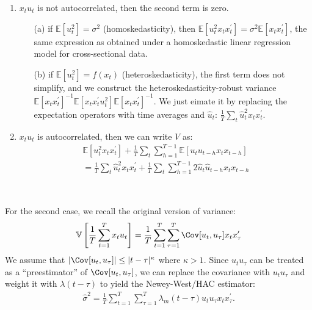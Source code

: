\begin{enumerate}
    \item $x_t u_t$ is not autocorrelated, then the second term is zero.
        \begin{enumerate}
            \item[(a)] if $\mathbb{E}[u_t^2] = \sigma^2$ (homoskedasticity), then $\mathbb{E}[u_t^2 x_t x_t^{\prime}] = \sigma^2 \mathbb{E}[x_t x_t^{\prime}]$,
            the same expression as obtained under a homoskedastic linear regression model for cross-sectional data.
            \item[(b)] if $\mathbb{E}[u_t^2] = f(x_t)$ (heteroskedasticity), the first term does not simplify,
            and we construct the heteroskedasticity-robust variance $\mathbb{E}[x_t x_t^{\prime}]^{-1} \mathbb{E}[x_t x_t^{\prime} u_t^2] \mathbb{E}[x_t x_t^{\prime}]^{-1}$.
            We just eimate it by replacing the expectation operators with time averages and $\hat{u}_t$: $\frac{1}{T} \sum_{t} \hat{u}_t^2 x_t x_t^{\prime}.$
        \end{enumerate}
    \item $x_t u_t$ is autocorrelated, then we can write $V$ as:
        \begin{gather*}
            \mathbb{E}[u_t^2 x_t x_t^{\prime}] + \frac{1}{T} \sum_{t} \sum_{h=1}^{T-1} \mathbb{E}[u_t u_{t-h} x_t x_{t-h}] \\
            = \frac{1}{T} \sum_{t} \hat{u}_t^2 x_t x_t^{\prime} + \frac{1}{T} \sum_{t} \sum_{h=1}^{T-1} 2 \hat{u}_t \hat{u}_{t-h} x_t x_{t-h}  
        \end{gather*}
\end{enumerate}

\begin{remark}
    \

    For the second case, we recall the original version of variance:
    \begin{gather*}
        \mathbb{V}\left[\frac{1}{T} \sum_{t=1}^{T} x_t u_t\right] = \frac{1}{T} \sum_{t=1}^{T} \sum_{\tau=1}^{T} \Cov[u_t, u_{\tau}] x_t x_{\tau}^{\prime}  
    \end{gather*}
    We assume that $\vert \Cov[u_t, u_{\tau}] \vert \leq \vert t-\tau \vert^{\kappa} $ where $\kappa>1$.
    Since $u_t u_{\tau}$ can be treated as a ``preestimator'' of $\Cov[u_t, u_{\tau}]$,
    we can replace the covariance with $u_t u_{\tau}$ and weight it with $\lambda(t-\tau)$ to yield the Newey-West/HAC estimator:
    \begin{gather*}
        \hat{\sigma}^2 = \frac{1}{T} \sum_{t=1}^{T} \sum_{\tau=1}^{T} \lambda_m(t-\tau) u_t u_{\tau} x_t x_{\tau}^{\prime}.
    \end{gather*}
\end{remark}
